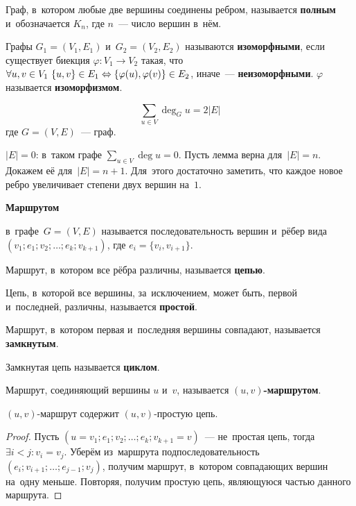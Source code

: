 \hypertarget{def:complete_graph}{} Граф, в~котором любые две вершины соединены ребром, называется \textbf{полным} и~обозначается $K_n$, где $n$~--- число вершин в~нём.

\hypertarget{def:graph_isomorphism}{} Графы $G_1 = (V_1, E_1)$ и~$G_2 = (V_2, E_2)$ называются \textbf{изоморфными}, если существует биекция $\varphi \colon V_1 \to V_2$ такая, что
$\forall u, v \in V_1 \ \allowbreak \{ u, v \} \in E_1 \opbr\Leftrightarrow \{ \varphi(u), \varphi(v) \} \in E_2$, иначе~--- \textbf{неизоморфными}.
$\varphi$ называется \textbf{изоморфизмом}.

\begin{lemma}[о рукопожатиях]
\begin{equation*}
\sum_{u \in V} \deg_G u = 2|E|
\end{equation*}
где $G = (V, E)$~--- граф.
\end{lemma}
\begin{proofmathind}
	\indbase $|E| = 0$: в~таком графе $\displaystyle \sum_{u \in V} \deg u = 0$.
	\newpage
	\indstep Пусть лемма верна для~$|E| = n$.
	Докажем её для~$|E| = n + 1$.
	Для~этого достаточно заметить, что каждое новое ребро увеличивает степени двух вершин на~$1$. \indend
\end{proofmathind}

\hypertarget{def:walk}{\textbf{Маршрутом}} в~графе~$G = (V, E)$ называется последовательность вершин и~рёбер вида\newline
$(v_1; e_1; v_2; \ldots; e_k; v_{k+1})$, где $e_i = \{ v_i, v_{i+1} \}$.

\hypertarget{def:trail}{} Маршрут, в~котором все рёбра различны, называется \textbf{цепью}.

Цепь, в~которой все вершины, за~исключением, может быть, первой и~последней, различны, называется \textbf{простой}.

Маршрут, в~котором первая и~последняя вершины совпадают, называется \textbf{замкнутым}.

\hypertarget{def:cycle}{} Замкнутая цепь называется \textbf{циклом}.

Маршрут, соединяющий вершины $u$ и~$v$, называется \textbf{$(u, v)$\nobreakdash-\hspace{0pt}маршрутом}.

\begin{lemma}
$(u, v)$\nobreakdash-\hspace{0pt}маршрут содержит $(u, v)$\nobreakdash-\hspace{0pt}простую цепь.
\end{lemma}
\begin{proof}
Пусть $(u = v_1; e_1; v_2; \ldots; e_k; v_{k+1} = v)$~--- не~простая цепь, тогда $\exists i < j \colon v_i = v_j$.
Уберём из~маршрута подпоследовательность $(e_i; v_{i+1}; \ldots; e_{j-1}; v_j)$, получим маршрут, в~котором совпадающих вершин на~одну меньше.
Повторяя, получим простую цепь, являющуюся частью данного маршрута.
\end{proof}


